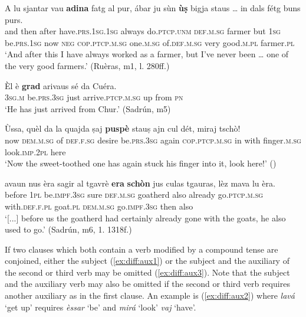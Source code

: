 \ea\label{ex:betgasynt2}
\gll    A lu sjantar vau \textbf{adina} fatg al pur, ábar ju sùn \textbf{ùṣ} bigja staus … in dals fétg buns purs.\\
and then after have.\textsc{prs.1sg.1sg} always do.\textsc{ptcp.unm} \textsc{def.m.sg} farmer but  \textsc{1sg} be.\textsc{prs.1sg} now \textsc{neg} \textsc{cop.ptcp.m.sg} {} one.\textsc{m.sg} of.\textsc{def.m.sg} very good.\textsc{m.pl} farmer.\textsc{pl}\\
\glt `And after this I have always worked as a farmer, but I’ve never been … one of the very good farmers.' (Ruèras, m1, l. 280ff.)
\z

\ea
\label{ex:betgasynt3}
\gll Èl è \textbf{grad} arivaus sé da Cuéra.\\
\textsc{3sg.m} be.\textsc{prs.3sg} just arrive.\textsc{ptcp.m.sg} up from \textsc{pn}\\
\glt `He has just arrived from Chur.' (Sadrún, m5)
\z

\ea\label{ex:betgasynt4}
\gll Ùssa, quèl da la quajda ṣaj \textbf{puspè} stauṣ ajn cul dét, miraj tschò!\\
   now \textsc{dem.m.sg} of \textsc{def.f.sg} desire be.\textsc{prs.3sg} again \textsc{cop.ptcp.m.sg} in with finger.\textsc{m.sg} look.\textsc{imp.2pl} here\\
\glt `Now the sweet-toothed one has again stuck his finger into it, look here!' ()
\z

\ea
\label{ex:betgasynt5}
\gll    [...] avaun nus èra sagir al tgavrè \textbf{era} \textbf{schòn} jus culas tgauras, lèz mava lu èra.\\
{} before \textsc{1pl} be.\textsc{impf.3sg} sure \textsc{def.m.sg} goatherd also already go.\textsc{ptcp.m.sg} with.\textsc{def.f.pl} goat.\textsc{pl} \textsc{dem.m.sg} go.\textsc{impf.3sg} then also\\
\glt `[...] before us the goatherd had certainly already gone with the goats, he also used to go.' (Sadrún, m6, 1. 1318f.)
\z

If two clauses which both contain a verb modified by a compound tense are conjoined, either the subject (\ref{ex:diff:aux1}) or the subject and the auxiliary of the second or third verb may be omitted (\ref{ex:diff:aux3}). Note that the subject and the auxiliary verb may also be omitted if the second or third verb requires another auxiliary as in the first clause. An example is (\ref{ex:diff:aux2}) where \textit{lavá} `get up' requires \textit{èssar} `be' and \textit{mirá} `look' \textit{vaj} `have'.

